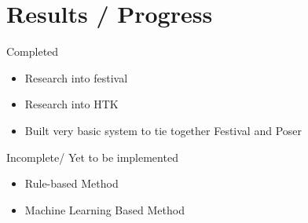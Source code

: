 \documentclass[bsc,frontabs,twoside,singlespacing,parskip]{infthesis}
\begin{document}
\chapter{Results / Progress}

Completed
\begin{itemize}
	\item{Research into festival}
	\item{Research into HTK}
	\item{Built very basic system to tie together Festival and Poser}
\end{itemize}
Incomplete/ Yet to be implemented
\begin{itemize}
	\item{Rule-based Method}
	\item{Machine Learning Based Method}
\end{itemize}



\end{document}

